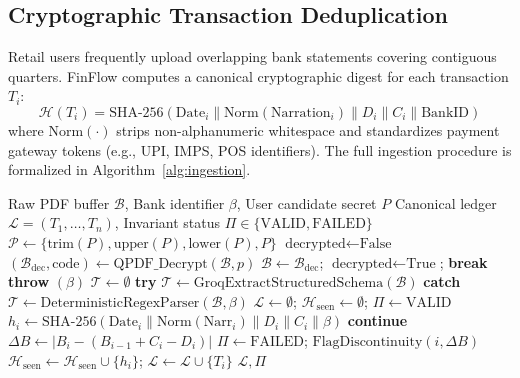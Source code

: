 \documentclass[conference]{IEEEtran}
\begin{document}
\subsection{Cryptographic Transaction Deduplication}
Retail users frequently upload overlapping bank statements covering contiguous quarters. FinFlow computes a canonical cryptographic digest for each transaction $T_i$:
\begin{equation}
\mathcal{H}(T_i) = \text{SHA-256}\left(\text{Date}_i \parallel \text{Norm}(\text{Narration}_i) \parallel D_i \parallel C_i \parallel \text{BankID}\right)
\label{eq:sha256}
\end{equation}
where $\text{Norm}(\cdot)$ strips non-alphanumeric whitespace and standardizes payment gateway tokens (e.g., UPI, IMPS, POS identifiers). The full ingestion procedure is formalized in Algorithm~\ref{alg:ingestion}.

\begin{algorithm}[t]
\caption{Formally Verified Multi-Bank Ingestion and Invariant Enforcement}
\label{alg:ingestion}
\begin{algorithmic}[1]
\REQUIRE Raw PDF buffer $\mathcal{B}$, Bank identifier $\beta$, User candidate secret $P$
\ENSURE Canonical ledger $\mathcal{L} = (T_1, \dots, T_n)$, Invariant status $\Pi \in \{\text{VALID}, \text{FAILED}\}$
    \STATE $\mathcal{P} \leftarrow \{\text{trim}(P), \text{upper}(P), \text{lower}(P), P\}$
    \STATE $\text{decrypted} \leftarrow \text{False}$
        \STATE $(\mathcal{B}_{\text{dec}}, \text{code}) \leftarrow \text{QPDF\_Decrypt}(\mathcal{B}, p)$
            \STATE $\mathcal{B} \leftarrow \mathcal{B}_{\text{dec}}$; $\text{decrypted} \leftarrow \text{True}$; \textbf{break}
        \ENDIF
    \ENDFOR
        \STATE \textbf{throw} $(\beta)$
    \ENDIF
\ENDIF
\STATE $\mathcal{T} \leftarrow \emptyset$
\STATE \textbf{try} $\mathcal{T} \leftarrow \text{GroqExtractStructuredSchema}(\mathcal{B})$ \textbf{catch} $\mathcal{T} \leftarrow \text{DeterministicRegexParser}(\mathcal{B}, \beta)$
\STATE $\mathcal{L} \leftarrow \emptyset$; $\mathcal{H}_{\text{seen}} \leftarrow \emptyset$; $\Pi \leftarrow \text{VALID}$
    \STATE $h_i \leftarrow \text{SHA-256}(\text{Date}_i \parallel \text{Norm}(\text{Narr}_i) \parallel D_i \parallel C_i \parallel \beta)$
        \STATE \textbf{continue} 
    \ENDIF
        \STATE $\Delta B \leftarrow | B_i - (B_{i-1} + C_i - D_i) |$
            \STATE $\Pi \leftarrow \text{FAILED}$; $\text{FlagDiscontinuity}(i, \Delta B)$
        \ENDIF
    \ENDIF
    \STATE $\mathcal{H}_{\text{seen}} \leftarrow \mathcal{H}_{\text{seen}} \cup \{h_i\}$; $\mathcal{L} \leftarrow \mathcal{L} \cup \{T_i\}$
\ENDFOR
\RETURN $\mathcal{L}, \Pi$
\end{algorithmic}
\end{algorithm}
\end{document}
